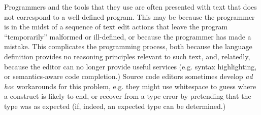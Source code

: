 






Programmers and the tools that they use are often presented with text that does not correspond to a well-defined program. This may be because the programmer is in the midst of a sequence of
text edit actions that leave the program ``temporarily'' malformed or ill-defined, or because the programmer has made a mistake. This complicates the programming process, both because the language definition provides no reasoning principles relevant to such text, and, relatedly, because the editor can no longer provide useful services (e.g. syntax highlighting, or semantics-aware code completion.) %
Source code editors sometimes develop \emph{ad hoc} workarounds for this problem, e.g. they might use whitespace to guess where a construct is likely to end, or recover from a type error by pretending that the type was as expected (if, indeed, an expected type can be determined.)

